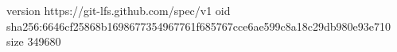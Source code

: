 version https://git-lfs.github.com/spec/v1
oid sha256:6646cf25868b1698677354967761f685767cce6ae599c8a18c29db980e93e710
size 349680
